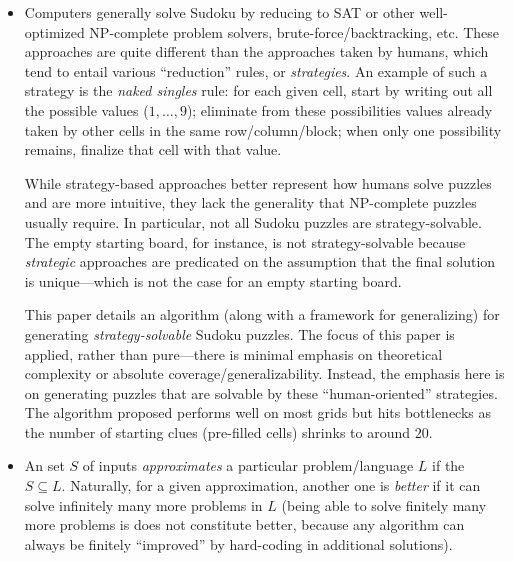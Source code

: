 \documentclass{extarticle}
\begin{document}
\begin{itemize}
  \item {}

    \begin{annotation}
      Computers generally solve Sudoku by reducing to SAT or other
      well-optimized NP-complete problem solvers, brute-force/backtracking,
      etc.  These approaches are quite different than the approaches taken by
      humans, which tend to entail various ``reduction'' rules, or
      \emph{strategies}.  An example of such a strategy is the \emph{naked
      singles} rule: for each given cell, start by writing out all the possible
      values (\(1, \dots, 9\)); eliminate from these possibilities values
      already taken by other cells in the same row/column/block; when only one
      possibility remains, finalize that cell with that value.

      While strategy-based approaches better represent how humans solve puzzles
      and are more intuitive, they lack the generality that NP-complete puzzles
      usually require.  In particular, not all Sudoku puzzles are
      strategy-solvable.  The empty starting board, for instance, is not
      strategy-solvable because \emph{strategic} approaches are predicated on
      the assumption that the final solution is unique---which is not the case
      for an empty starting board.

      This paper details an algorithm (along with a framework for generalizing)
      for generating \emph{strategy-solvable} Sudoku puzzles.  The focus of
      this paper is applied, rather than pure---there is minimal emphasis on
      theoretical complexity or absolute coverage/generalizability.  Instead,
      the emphasis here is on generating puzzles that are solvable by these
      ``human-oriented'' strategies.  The algorithm proposed performs well on
      most grids but hits bottlenecks as the number of starting clues
      (pre-filled cells) shrinks to around \(20\).
    \end{annotation}

  \item {}

    \begin{annotation}
      An set \(S\) of inputs \emph{approximates} a particular problem/language
      \(L\) if the \(S \subseteq L\).  Naturally, for a given approximation,
      another one is \emph{better} if it can solve infinitely many more
      problems in \(L\) (being able to solve finitely many more problems is
      does not constitute better, because any algorithm can always be finitely
      ``improved'' by hard-coding in additional solutions).


\end{annotation}
\end{itemize}
\end{document}
